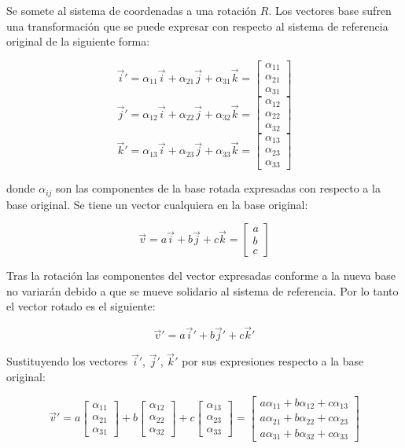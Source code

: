 \documentclass[10pt, a4paper]{report}
\begin{document}
Se somete al sistema de coordenadas a una rotación $R$. Los vectores base sufren una transformación que se puede expresar con respecto al sistema de referencia original de la siguiente forma:

$$ \vec{i}' = \alpha_{11}\vec{i} + \alpha_{21}\vec{j} + \alpha_{31}\vec{k} = \begin{bmatrix}  \alpha_{11}\\\alpha_{21}\\\alpha_{31} \end{bmatrix} $$
$$ \vec{j}' = \alpha_{12}\vec{i} + \alpha_{22}\vec{j} + \alpha_{32}\vec{k} = \begin{bmatrix} \alpha_{12}\\\alpha_{22}\\\alpha_{32} \end{bmatrix} $$
$$ \vec{k}' = \alpha_{13}\vec{i} + \alpha_{23}\vec{j} + \alpha_{33}\vec{k} = \begin{bmatrix} \alpha_{13}\\\alpha_{23}\\\alpha_{33} \end{bmatrix} $$

donde $\alpha_{ij}$ son las componentes de la base rotada expresadas con respecto a la base original. Se tiene un vector cualquiera en la base original:

$$ \vec{v} = a\vec{i} + b\vec{j} + c\vec{k} = \begin{bmatrix} a\\b\\c \end{bmatrix} $$

Tras la rotación las componentes del vector expresadas conforme a la nueva base no variarán debido a que se mueve solidario al sistema de referencia. Por lo tanto el vector rotado es el siguiente:

$$ \vec{v}' = a\vec{i}' + b\vec{j}' + c\vec{k}' $$

Sustituyendo los vectores $\vec{i}'$, $\vec{j}'$, $\vec{k}'$ por sus expresiones respecto a la base original:

$$ \vec{v}' = a \begin{bmatrix}  \alpha_{11}\\\alpha_{21}\\\alpha_{31} \end{bmatrix} + b \begin{bmatrix}  \alpha_{12}\\\alpha_{22}\\\alpha_{32} \end{bmatrix}  + c \begin{bmatrix}  \alpha_{13}\\\alpha_{23}\\\alpha_{33} \end{bmatrix} = \begin{bmatrix}  a\alpha_{11} + b\alpha_{12} + c\alpha_{13} \\ a\alpha_{21} + b\alpha_{22} + c\alpha_{23}\\ a\alpha_{31} + b\alpha_{32} + c\alpha_{33} \end{bmatrix} $$
\end{document}
